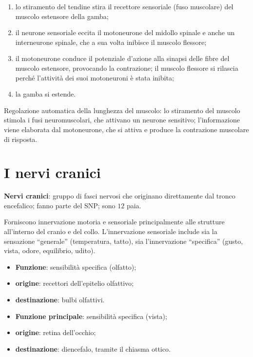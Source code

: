 \begin{enumerate}
  \item lo stiramento del tendine stira il recettore sensoriale (fuso
    muscolare) del muscolo estensore della gamba;
  \item il neurone sensoriale eccita il motoneurone del midollo spinale e
    anche un interneurone spinale, che a sua volta inibisce il muscolo
    flessore;
  \item il motoneurone conduce il potenziale d'azione alla sinapsi delle
    fibre del muscolo estensore, provocando la contrazione; il muscolo
    flessore si rilascia perché l'attività dei suoi motoneuroni è stata
    inibita;
  \item la gamba si estende.
\end{enumerate}

Regolazione automatica della lunghezza del muscolo: lo stiramento del
muscolo stimola i fusi neuromuscolari, che attivano un neurone sensitivo;
l'informazione viene elaborata dal motoneurone, che si attiva e produce la
contrazione muscolare di risposta.

\section{I nervi cranici}

\textbf{Nervi cranici}: gruppo di fasci nervosi che originano direttamente
dal tronco encefalico; fanno parte del SNP; sono $12$ paia.

Forniscono innervazione motoria e sensoriale principalmente alle strutture
all'interno del cranio e del collo. L'innervazione sensoriale include sia
la sensazione ``generale'' (temperatura, tatto), sia l'innervazione
``specifica'' (gusto, vista, odore, equilibrio, udito).

\begin{itemize}
  \item \textbf{Funzione}: sensibilità specifica (olfatto);
  \item \textbf{origine}: recettori dell'epitelio olfattivo;
  \item \textbf{destinazione}: bulbi olfattivi.
\end{itemize}

\begin{itemize}
  \item \textbf{Funzione principale}: sensibilità specifica (vista);
  \item \textbf{origine}: retina dell'occhio;
  \item \textbf{destinazione}: diencefalo, tramite il chiasma ottico.
\end{itemize}

